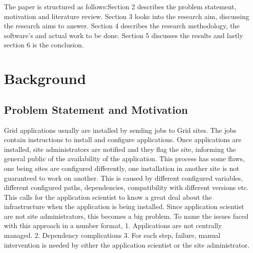 \documentclass [titlepage,11pt]{article}
\begin{document}
The paper is structured as follows:Section 2 describes the problem statement, motivation and literature review. Section 3 looks into the research aim, discussing the research aims to answer. Section 4 describes the research methodology, the software's and actual work to be done. Section 5 discusses the results and lastly section 6 is the conclusion. \\


\section{Background}

\subsection{Problem Statement and Motivation}

Grid applications usually are installed by sending jobs to Grid sites. The jobs contain instructions to install and configure applications. Once applications are installed, site administrators are notified and they flag the site, informing the general public of the availability of the application. This process has some flaws, one being sites are configured differently, one installation in another site is not guaranteed to work on another. This is caused by different configured variables, different configured paths, dependencies, compatibility with different versions etc. This calls for the application scientist to know a great deal about the infrastructure when the application is being installed. Since application scientist are not site administrators, this becomes a big problem. To name the issues faced with this approach in a number format, 1. Applications are not centrally managed. 2. Dependency complications 3. For each step, failure, manual intervention is needed by either the application scientist or the site administrator. \\
\end{document}
